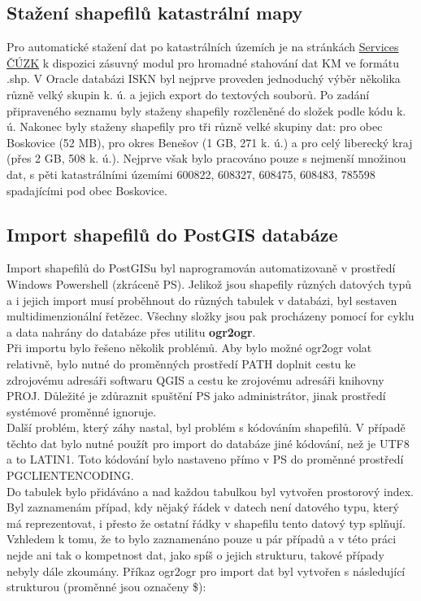 \documentclass[12pt]{article}
\begin{document}
\subsection{Stažení shapefilů katastrální mapy} 
Pro automatické stažení dat po katastrálních územích je na stránkách \href{http://services.cuzk.cz/shp/ku/QGIS-plugin/QGIS_verze-3.x/}{Services ČÚZK} k dispozici zásuvný modul pro hromadné stahování dat KM ve formátu .shp. V Oracle databázi ISKN byl nejprve proveden jednoduchý výběr několika různě velký skupin k. ú. a jejich export do textových souborů. Po zadání připraveného seznamu byly staženy shapefily rozčleněné do složek podle kódu k. ú. Nakonec byly staženy shapefily pro tři různě velké skupiny dat:  pro obec Boskovice (52 MB), pro okres Benešov (1 GB, 271 k. ú.) a pro celý liberecký kraj (přes 2 GB, 508 k. ú.). Nejprve však bylo pracováno pouze s nejmenší množinou dat, s pěti katastrálními územími 600822, 608327, 608475, 608483, 785598 spadajícími pod obec Boskovice. 

\subsection{Import shapefilů do PostGIS databáze}

Import shapefilů do PostGISu byl naprogramován automatizovaně v prostředí Windows Powershell (zkráceně PS). Jelikož jsou shapefily různých datových typů a i jejich import musí proběhnout do různých tabulek v databázi, byl sestaven multidimenzionální řetězec. Všechny složky jsou pak procházeny pomocí for cyklu a data nahrány do databáze přes utilitu \textbf{ogr2ogr}. \\
\indent Při importu bylo řešeno několik problémů. Aby bylo možné ogr2ogr volat relativně, bylo nutné do proměnných prostředí PATH doplnit cestu ke zdrojovému adresáři softwaru QGIS a cestu ke zrojovému adresáři knihovny PROJ. Důležité je zdůraznit spuštění PS jako administrátor, jinak prostředí systémové proměnné ignoruje. \\
\indent Další problém, který záhy nastal, byl problém s kódováním shapefilů. V případě těchto dat bylo nutné použít pro import do databáze jiné kódování, než je UTF8 a to LATIN1. Toto kódování bylo nastaveno přímo v PS do proměnné prostředí PGCLIENTENCODING. \\
\indent Do tabulek bylo přidáváno a nad každou tabulkou byl vytvořen prostorový index. Byl zaznamenám případ, kdy nějaký řádek v datech není datového typu, který má reprezentovat, i přesto že ostatní řádky v shapefilu tento datový typ splňují. Vzhledem k tomu, že to bylo zaznamenáno pouze u pár případů a v této práci nejde ani tak o kompetnost dat, jako spíš o jejich strukturu, takové případy nebyly dále zkoumány. Příkaz ogr2ogr pro import dat byl vytvořen s následující strukturou (proměnné jsou označeny \$):
\end{document}
